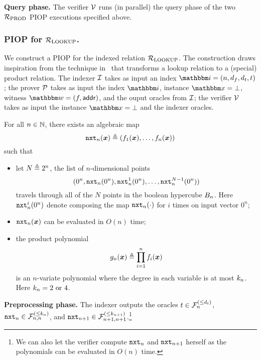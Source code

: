 \textbf{Query phase.}
The verifier $\mathcal{V}$ runs (in parallel) the query phase of the two ${\mathcal{R}}_{\text{PROD}}$ PIOP 
executions specified above.


\subsubsection*{PIOP for ${\mathcal{R}}_{\text{LOOKUP}}$.} 
We construct a PIOP for the indexed relation ${\mathcal{R}}_{\text{LOOKUP}}$.
The construction draws inspiration from the technique in~\cite{GW20} that 
transforms a lookup relation to a (special) product relation.
The indexer $\mathcal{I}$ takes as input an index $\idxR = (n, d_f, d_t, t)$;
the prover $\mathcal{P}$ takes as input the index $\idxR$, instance $\instR = \bot$,
witness $\witR = (f, \addr)$, and the ouput oracles from $\mathcal{I}$;
the verifier $\mathcal{V}$ takes as input the instance $\instR = \bot$ and 
the indexer oracles.

\begin{lemma}
    For all $n \in \mathbb{N}$, there exists an algebraic map
    \[
      \mathtt{nxt}_{n}(\boldsymbol{x}) \mathrel{\triangleq} (f_{1}(\boldsymbol{x}), \dots, f_{n}(\boldsymbol{x}))  
    \] such that 
    \begin{itemize}
        \item let $N \mathrel{\triangleq} 2^n$, the list of $n$-dimensional points
            \[
              (0^n, \mathtt{nxt}_{n}(0^n), \mathtt{nxt}_{n}^{1}(0^n), \dots, \mathtt{nxt}_{n}^{N-1}(0^n))
            \]
            travels through all of the $N$ points in the boolean hypercube $B_{n}$.
            Here $\mathtt{nxt}_{n}^{i}(0^n)$ denote composing the map $\mathtt{nxt}_{n}(\cdot)$ for $i$ times
            on input vector $0^n$;
        \item $\mathtt{nxt}_{n}(\boldsymbol{x})$ can be evaluated in $O(n)$ time;
        \item the product polynomial
            \[
                g_n(\boldsymbol{x}) \mathrel{\triangleq} \prod_{i=1}^{n} f_{i}(\boldsymbol{x})
            \] is an $n$-variate polynomial where the degree in each variable is at most $k_{n}$.
            Here $k_{n} = 2 \text{ or } 4$.
    \end{itemize}
\end{lemma}

\textbf{Preprocessing phase.}
The indexer outputs the oracles $t \in {\mathcal{F}}_{n}^{(\le{d_t})}$, $\mathtt{nxt}_{n} \in {\mathcal{F}}_{n,n}^{(\le{k_{n}})}$,
and $\mathtt{nxt}_{n+1} \in {\mathcal{F}}_{n+1,n+1}^{(\le{k_{n+1}})}$.\footnote{We can also let the verifier 
compute $\mathtt{nxt}_{n}$ and $\mathtt{nxt}_{n+1}$ herself as the polynomials can be evaluated in $O(n)$ time.}

